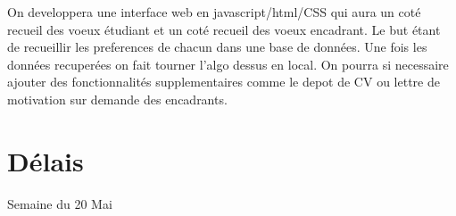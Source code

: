 \documentclass{article}
\begin{document}
On developpera une interface web en javascript/html/CSS qui aura un coté recueil des voeux étudiant et un coté recueil des voeux encadrant.
Le but étant de recueillir les preferences de chacun dans une base de données. Une fois les données recuperées on fait tourner l'algo dessus en local.
On pourra si necessaire ajouter des fonctionnalités supplementaires comme le depot de CV ou lettre de motivation sur demande des encadrants.


\section{Délais}

Semaine du 20 Mai
\end{document}
